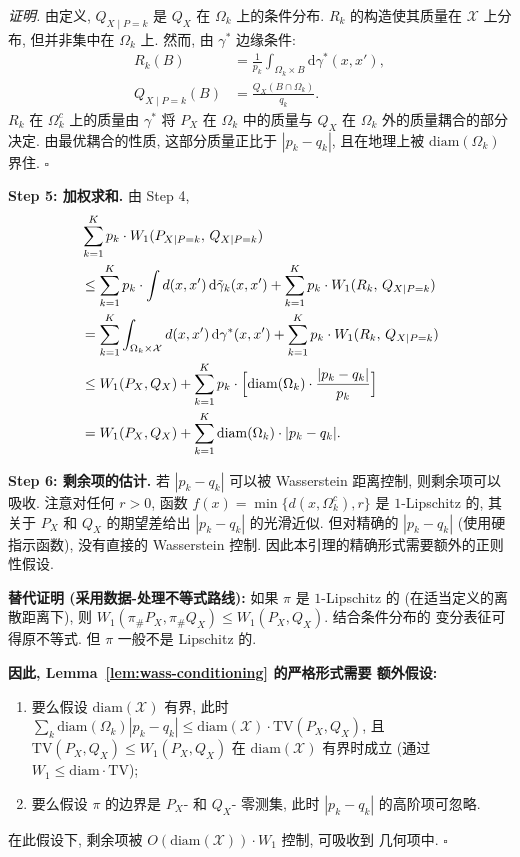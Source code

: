 \documentclass[12pt,a4paper]{article}
\newcommand{\cX}{\mathcal{X}}
\newcommand{\diam}{\mathrm{diam}}
\newcommand{\TV}{\mathrm{TV}}
\begin{document}
\textit{证明.}
由定义, $Q_{X\mid P=k}$ 是 $Q_X$ 在 $\Omega_k$ 上的条件分布.
$R_k$ 的构造使其质量在 $\cX$ 上分布, 但并非集中在 $\Omega_k$ 上.
然而, 由 $\gamma^*$ 边缘条件:
\begin{align*}
    R_k(B) &= \frac{1}{p_k}\int_{\Omega_k\times B}\mathrm{d}\gamma^*(x,x'),\\
    Q_{X\mid P=k}(B) &= \frac{Q_X(B\cap\Omega_k)}{q_k}.
\end{align*}
$R_k$ 在 $\Omega_k^c$ 上的质量由 $\gamma^*$ 将 $P_X$ 在
$\Omega_k$ 中的质量与 $Q_X$ 在 $\Omega_k$ 外的质量耦合的部分
决定. 由最优耦合的性质, 这部分质量正比于 $|p_k-q_k|$,
且在地理上被 $\diam(\Omega_k)$ 界住. \hfill $\square$

\textbf{Step 5: 加权求和.}
由 Step 4,
\begin{align*}
    &\sum_{k=1}^K p_k\cdot W_1(P_{X\mid P=k},\,Q_{X\mid P=k}) \\
    &\leq \sum_{k=1}^K p_k\cdot \int d(x,x')\,\mathrm{d}\tilde{\gamma}_k(x,x')
          + \sum_{k=1}^K p_k\cdot W_1(R_k,\,Q_{X\mid P=k}) \\
    &= \sum_{k=1}^K \int_{\Omega_k\times\cX} d(x,x')\,\mathrm{d}\gamma^*(x,x')
       + \sum_{k=1}^K p_k\cdot W_1(R_k,\,Q_{X\mid P=k}) \\
    &\leq W_1(P_X,Q_X) + \sum_{k=1}^K p_k\cdot
       \Bigl[\diam(\Omega_k)\cdot\frac{|p_k-q_k|}{p_k}\Bigr] \\
    &= W_1(P_X,Q_X) + \sum_{k=1}^K \diam(\Omega_k)\cdot|p_k-q_k|.
\end{align*}

\textbf{Step 6: 剩余项的估计.}
若 $|p_k-q_k|$ 可以被 Wasserstein 距离控制, 则剩余项可以吸收.
注意对任何 $r>0$, 函数 $f(x)=\min\{d(x,\Omega_k^c), r\}$ 是
$1$-Lipschitz 的, 其关于 $P_X$ 和 $Q_X$ 的期望差给出 $|p_k-q_k|$
的光滑近似. 但对精确的 $|p_k-q_k|$ (使用硬指示函数), 没有直接的
Wasserstein 控制. 因此本引理的精确形式需要额外的正则性假设.

\textbf{替代证明 (采用数据-处理不等式路线):}
如果 $\pi$ 是 $1$-Lipschitz 的 (在适当定义的离散距离下), 则
$W_1(\pi_\#P_X,\pi_\#Q_X) \leq W_1(P_X,Q_X)$. 结合条件分布的
变分表征可得原不等式. 但 $\pi$ 一般不是 Lipschitz 的.

\textbf{因此, Lemma~\ref{lem:wass-conditioning} 的严格形式需要
额外假设:}
\begin{enumerate}
    \item 要么假设 $\diam(\cX)$ 有界, 此时 $\sum_k\diam(\Omega_k)
          |p_k-q_k|\leq\diam(\cX)\cdot\TV(P_X,Q_X)$, 且
          $\TV(P_X,Q_X)\leq W_1(P_X,Q_X)$ 在 $\diam(\cX)$ 有界时成立
          (通过 $W_1\leq \diam\cdot\TV$);
    \item 要么假设 $\pi$ 的边界是 $P_X$- 和 $Q_X$- 零测集,
          此时 $|p_k-q_k|$ 的高阶项可忽略.
\end{enumerate}
在此假设下, 剩余项被 $O(\diam(\cX))\cdot W_1$ 控制, 可吸收到
几何项中. \hfill $\square$
\end{document}

